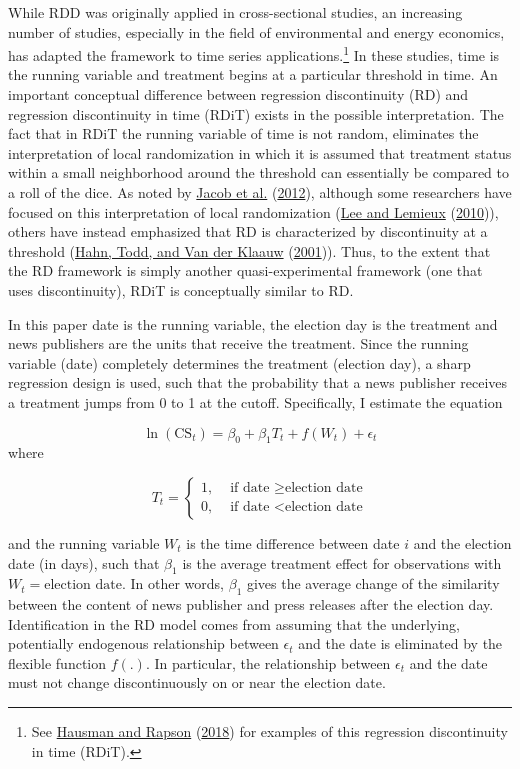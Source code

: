 \documentclass[
]{article}
\begin{document}
While RDD was originally applied in cross-sectional studies, an
increasing number of studies, especially in the field of environmental
and energy economics, has adapted the framework to time series
applications.\footnote{See
  \protect\hyperlink{ref-hausman_regression_2018}{Hausman and Rapson}
  (\protect\hyperlink{ref-hausman_regression_2018}{2018}) for examples
  of this regression discontinuity in time (RDiT).} In these studies,
time is the running variable and treatment begins at a particular
threshold in time. An important conceptual difference between regression
discontinuity (RD) and regression discontinuity in time (RDiT) exists in
the possible interpretation. The fact that in RDiT the running variable
of time is not random, eliminates the interpretation of local
randomization in which it is assumed that treatment status within a
small neighborhood around the threshold can essentially be compared to a
roll of the dice. As noted by
\protect\hyperlink{ref-jacob_practical_2012}{Jacob et al.}
(\protect\hyperlink{ref-jacob_practical_2012}{2012}), although some
researchers have focused on this interpretation of local randomization
(\protect\hyperlink{ref-lee_regression_2010}{Lee and Lemieux}
(\protect\hyperlink{ref-lee_regression_2010}{2010})), others have
instead emphasized that RD is characterized by discontinuity at a
threshold (\protect\hyperlink{ref-hahn_identification_2001}{Hahn, Todd,
and Van der Klaauw}
(\protect\hyperlink{ref-hahn_identification_2001}{2001})). Thus, to the
extent that the RD framework is simply another quasi-experimental
framework (one that uses discontinuity), RDiT is conceptually similar to
RD.

In this paper date is the running variable, the election day is the
treatment and news publishers are the units that receive the treatment.
Since the running variable (date) completely determines the treatment
(election day), a sharp regression design is used, such that the
probability that a news publisher receives a treatment jumps from 0 to 1
at the cutoff. Specifically, I estimate the equation

\[
\ln(\text{CS}_{t})=\beta_0+\beta_1T_t+f(W_t)+\epsilon_t
\] where

\[
T_t = 
\begin{cases}
1, & \text{ if date } \geq \text{election date} \\
0, & \text{ if date } < \text{election date}
\end{cases}
\]

and the running variable \(W_t\) is the time difference between date
\(i\) and the election date (in days), such that \(\beta_1\) is the
average treatment effect for observations with
\(W_t = \text{election date}\). In other words, \(\beta_1\) gives the
average change of the similarity between the content of news publisher
and press releases after the election day. Identification in the RD
model comes from assuming that the underlying, potentially endogenous
relationship between \(\epsilon_t\) and the date is eliminated by the
flexible function \(f(.)\). In particular, the relationship between
\(\epsilon_t\) and the date must not change discontinuously on or near
the election date.
\end{document}
